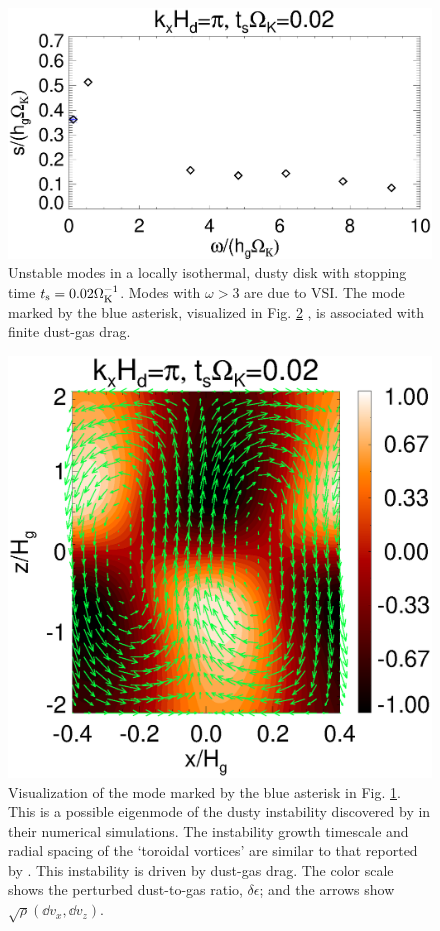 \begin{figure}
  \includegraphics[width=\linewidth]{figures/compare_eigenvals_ts0d02}
  \caption{Unstable modes in a locally isothermal, dusty disk
    with stopping time  
    $t_\mathrm{s}=0.02\Omega_{\rm K}^{-1}$. Modes with $\omega>3$ are due to
    VSI. The mode marked by the blue asterisk, visualized in
    Fig. \protect\ref{result2d_loren}
    , is associated with finite dust-gas
    drag. 
  }\label{compare_eigenvals_ts0d02}
\end{figure}


\begin{figure}
  \includegraphics[width=\linewidth]{figures/result2d_loren.ps}
  \caption{Visualization of the mode marked by the blue asterisk in
    Fig. \protect\ref{compare_eigenvals_ts0d02}. 
    This is a possible eigenmode of the dusty instability discovered by  
    \cite{loren15} in their numerical simulations. The instability growth timescale and 
    radial spacing of the `toroidal vortices' are similar to that 
    reported by \citeauthor{loren15}. This instability is driven by
    dust-gas drag. The color scale shows the 
    perturbed  
    dust-to-gas ratio, $\delta\epsilon$; and the arrows show
    $\sqrt{\rho}\left(\dd v_x, \dd v_z\right)$. 
  }\label{result2d_loren}
\end{figure}

